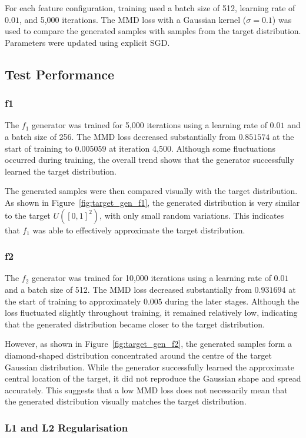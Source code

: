 \documentclass[conference,a4paper]{IEEEtran}
\begin{document}
For each feature configuration, training used a batch size of 512, learning rate of \(0.01\), and 5,000 iterations. The MMD loss with a Gaussian kernel (\(\sigma=0.1\)) was used to compare the generated samples with samples from the target distribution. Parameters were updated using explicit SGD.

\subsection{Test Performance}
\subsubsection{f1}
The \(f_1\) generator was trained for 5,000 iterations using a learning rate of \(0.01\) and a batch size of 256. The MMD loss decreased substantially from \(0.851574\) at the start of training to \(0.005059\) at iteration 4,500. Although some fluctuations occurred during training, the overall trend shows that the generator successfully learned the target distribution.

The generated samples were then compared visually with the target distribution. As shown in Figure~\ref{fig:target_gen_f1}, the generated distribution is very similar to the target \(U([0,1]^2)\), with only small random variations. This indicates that \(f_1\) was able to effectively approximate the target distribution.

\subsubsection{f2}
The \(f_2\) generator was trained for 10,000 iterations using a learning rate of \(0.01\) and a batch size of 512. The MMD loss decreased substantially from \(0.931694\) at the start of training to approximately \(0.005\) during the later stages. Although the loss fluctuated slightly throughout training, it remained relatively low, indicating that the generated distribution became closer to the target distribution.

However, as shown in Figure~\ref{fig:target_gen_f2}, the generated samples form a diamond-shaped distribution concentrated around the centre of the target Gaussian distribution. While the generator successfully learned the approximate central location of the target, it did not reproduce the Gaussian shape and spread accurately. This suggests that a low MMD loss does not necessarily mean that the generated distribution visually matches the target distribution.
\subsubsection{L1 and L2 Regularisation}
\end{document}
